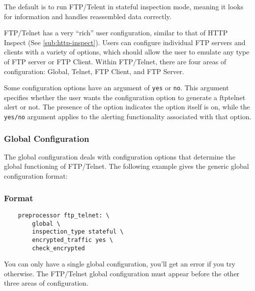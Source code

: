 \documentclass[english]{report}
\newenvironment{note}{
\samepage
    \vspace{10pt}{\textsf{
        {\hspace{7pt}\Huge{$\triangle$\hspace{-12.5pt}{\Large{$^!$}}}}\hspace{5pt}
        {\Large{NOTE}}
    }
    }
   \begin{center}
    \par\vspace{-17pt}

    \begin{lrbox}{\savepar}
    \begin{minipage}[r]{6in}
}
{
    \end{minipage}
    \end{lrbox}
    \fbox{
        \usebox{
            \savepar
	}
    }
    \par\vskip10pt
    \end{center}
}
\newenvironment{note}{
        \begin{rawhtml}
        <p><table border="1"><tr><td><b>
        Note:&nbsp;&nbsp;</b>
        \end{rawhtml}
}{
        \begin{rawhtml}
        </b></td></tr></table></p>
        \end{rawhtml}
}
\begin{document}
The default is to run FTP/Telent in stateful inspection mode, meaning it looks
for information and handles reassembled data correctly.

FTP/Telnet has a very ``rich'' user configuration, similar to that of HTTP
Inspect (See \ref{sub:http-inspect}).  Users can configure individual FTP
servers and clients with a variety of options, which should allow the user to
emulate any type of FTP server or FTP Client.  Within FTP/Telnet, there are
four areas of configuration: Global, Telnet, FTP Client, and FTP Server.

\begin{note}

Some configuration options have an argument of \texttt{yes} or \texttt{no}.
This argument specifies whether the user wants the configuration option to
generate a ftptelnet alert or not.  The presence of the option indicates the
option itself is on, while the \texttt{yes/no} argument applies to the alerting
functionality associated with that option.

\end{note}

\subsubsection{Global Configuration}

The global configuration deals with configuration options that determine the
global functioning of FTP/Telnet.  The following example gives the generic
global configuration format:

\subsubsection{Format}

\begin{verbatim}
    preprocessor ftp_telnet: \
        global \
        inspection_type stateful \
        encrypted_traffic yes \
        check_encrypted
\end{verbatim}

You can only have a single global configuration, you'll get an error if you try
otherwise.  The FTP/Telnet global configuration must appear before the other
three areas of configuration.
\end{document}
